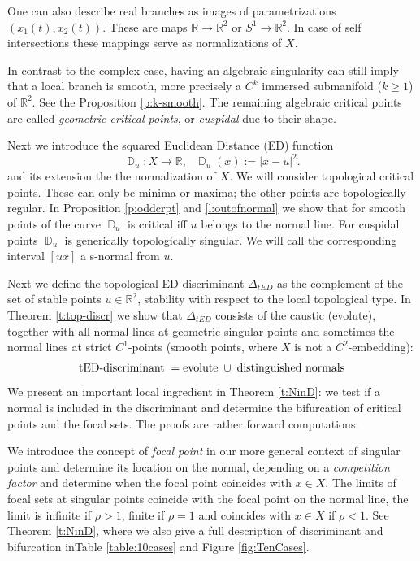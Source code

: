 \documentclass[12pt,a4,twoside]{amsart}
\DeclareMathOperator{\sq}{\mathbb{D}}
\newtheorem*{main lemma}{The main lemma}
\begin{document}
One can also describe real branches as images of  parametrizations $(x_1(t),x_2(t))$.
These are maps $\mathbb{R}\to \mathbb{R}^2 $ or $S^1 \to \mathbb{R}^2$. In case of self intersections these  mappings serve as normalizations of $X$.

In contrast to  the complex case, having an algebraic singularity can still imply that a local branch is smooth, more precisely  a $C^k$ immersed submanifold ($k \ge 1$) of $\mathbb{R}^2$. See the Proposition \ref{p:k-smooth}. The remaining algebraic critical points are called \textit{geometric critical points}, or \textit{cuspidal} due to their shape.

Next we introduce the squared Euclidean Distance (ED) function
\begin{equation}\label{e:sqd0}
\sq_u:X\rightarrow \mathbb{R}, \ \ \  \sq_u(x):=|x-u|^2.
\end{equation}
and its extension the the normalization of $X$. We will consider topological critical points. These can only be minima or maxima; the other points are topologically regular.
In Proposition \ref{p:oddcrpt}   and \ref{l:outofnormal}  we show that for smooth points of the curve $\sq_u$ is critical iff $u$ belongs to the normal line. For cuspidal points $\sq_u$ is generically topologically singular. We will call the corresponding interval $[ux]$ a s-normal from $u$.

Next we define the topological ED-discriminant $\Delta_{tED}$ as the complement of the set of stable points $u \in \mathbb{R}^2$, stability with respect to the local topological type. In Theorem \ref{t:top-discr} we show that
$\Delta_{tED}$  consists of the caustic (evolute), together with all normal  lines  at  geometric singular points  and  sometimes the normal lines at strict $C^1$-points (smooth points, where $X$ is not a $C^2$-embedding):
$$  \mbox{\rm tED-discriminant}  \; = \mbox{\rm evolute}  \; \cup \;  \mbox{\rm distinguished  normals}$$
We  present an important local  ingredient  in  Theorem \ref{t:NinD}:  we test if a normal is included in the discriminant and determine the bifurcation of critical points and the focal sets.  The proofs are rather forward computations.

We introduce the concept of \textit{focal point} in our more general context of singular points  and determine its location on the normal, depending on a \textit{competition factor} and determine when the focal point coincides with $x \in X$. 
The limits of focal sets at  singular points coincide with the focal point on the normal line, the limit is infinite if $\rho > 1$, finite if $\rho=1$ and coincides with $x \in X$ if $\rho < 1$. See Theorem \ref{t:NinD}, where we also give a full description of discriminant and bifurcation inTable  \ref{table:10cases} and Figure  \ref{fig:TenCases}.
\end{document}
